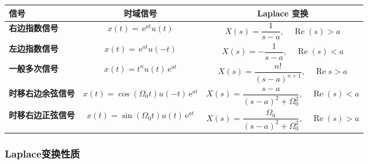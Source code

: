 \documentclass[UTF8,fontset=fandol,zihao=5]{ctexart}
\newcommand{\ee}{\,\mathrm{e}}
\newcommand{\RRe}{\operatorname{Re}}
\begin{document}
\begin{table}[H]
  \centering
  \begin{tabularx}{\textwidth}{>{\bfseries}p{3cm} c c}
    \toprule
    信号 & 时域信号 & Laplace 变换 \\
    \midrule
    右边指数信号 & $x(t)=\ee^{at}u(t)$
      & $X(s)=\dfrac{1}{s-a},\quad \operatorname{Re}(s)>a$ \\

    左边指数信号 & $x(t)=\ee^{at}u(-t)$
      & $X(s)=-\dfrac{1}{s-a},\quad \operatorname{Re}(s)<a$ \\
    
    一般多次信号  & $x(t)=t^n u(t) \ee^{at}$
      & $X(s)=\dfrac{n!}{(s-a)^{n+1}},\quad \RRe s > a$ \\

    时移右边余弦信号 & $x(t)=\cos(\varOmega_0t)u(-t)\ee^{at}$
      & $X(s)=\dfrac{s-a}{(s-a)^2+\varOmega_0^2},
        \quad \operatorname{Re}(s)<a$ \\

    时移右边正弦信号 & $x(t)=\sin(\varOmega_0t)u(t)\ee^{at}$
      & $X(s)=\dfrac{\varOmega_0}{(s-a)^2+\varOmega_0^2},
        \quad \operatorname{Re}(s)>a$ \\
    \bottomrule
  \end{tabularx}
\end{table}

\subsubsection{Laplace变换性质}
\end{document}
